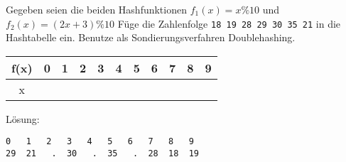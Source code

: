 
\renewcommand{\arraystretch}{2.0}
\setlength{\tabcolsep}{14pt}
\question[4]
Gegeben seien die beiden Hashfunktionen $f_1(x) = x \% 10$ und $f_2(x) = (2x+3) \% 10$
Füge die Zahlenfolge
\texttt{18 19 28 29 30 35 21}  in die Hashtabelle ein.
Benutze als Sondierungsverfahren Doublehashing.

\begin{tabular}{|c|c|c|c|c|c|c|c|c|c|c|}
\hline f(x) & 0 & 1 & 2 & 3 & 4 & 5 & 6 & 7 & 8 & 9 \\
\hline x     &   &    &    &   &   &    &    &   &   & \\
\hline
\end{tabular}

\ifprintanswers
Lösung:
\begin{lstlisting}
0   1   2   3   4   5   6   7   8   9
29  21   .  30   .  35   .  28  18  19
\end{lstlisting}
\fi
